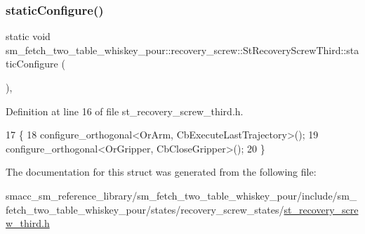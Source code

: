 \subsubsection{\texorpdfstring{static\+Configure()}{staticConfigure()}}
{\footnotesize\ttfamily static void sm\+\_\+fetch\+\_\+two\+\_\+table\+\_\+whiskey\+\_\+pour\+::recovery\+\_\+screw\+::\+St\+Recovery\+Screw\+Third\+::static\+Configure (\begin{DoxyParamCaption}{ }\end{DoxyParamCaption})\hspace{0.3cm}{\ttfamily [inline]}, {\ttfamily [static]}}



Definition at line 16 of file st\+\_\+recovery\+\_\+screw\+\_\+third.\+h.


\begin{DoxyCode}
17             \{
18                 configure\_orthogonal<OrArm, CbExecuteLastTrajectory>();
19                 configure\_orthogonal<OrGripper, CbCloseGripper>();
20             \}
\end{DoxyCode}


The documentation for this struct was generated from the following file\+:\begin{DoxyCompactItemize}
\item 
smacc\+\_\+sm\+\_\+reference\+\_\+library/sm\+\_\+fetch\+\_\+two\+\_\+table\+\_\+whiskey\+\_\+pour/include/sm\+\_\+fetch\+\_\+two\+\_\+table\+\_\+whiskey\+\_\+pour/states/recovery\+\_\+screw\+\_\+states/\hyperlink{st__recovery__screw__third_8h}{st\+\_\+recovery\+\_\+screw\+\_\+third.\+h}\end{DoxyCompactItemize}
